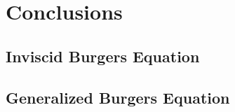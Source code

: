 \documentclass[11pt, a4paper]{article}
\begin{document}
\section{Conclusions}
\subsection{Inviscid Burgers Equation}

\subsection{Generalized Burgers Equation}
\end{document}
